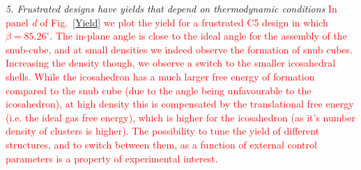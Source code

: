 \documentclass[a4paper, amsfonts, amssymb, amsmath, reprint, showkeys, nofootinbib, twoside]{revtex4-1}
\begin{document}

\noindent
\emph{5. Frustrated designs have yields that depend on thermodynamic conditions} \textcolor{red}{
In panel \textit{d} of Fig.~\ref{Yield} we plot the yield for a frustrated C5 design in which $\beta=85.26^\circ$. The in-plane angle is close to the ideal angle for the assembly of the snub-cube, and at small densities we indeed observe the formation of snub cubes. Increasing the density though, we observe a switch to the smaller icosahedral shells. While the icosahedron has a much larger free energy of formation compared to the snub cube (due to the angle being unfavourable to the icosahedron), at high density this is compensated by the translational free energy (i.e. the ideal gas free energy), which is higher for the icosahedron (as it's number density of clusters is higher). The possibility to tune the yield of different structures, and to switch between them, as a function of external control parameters is a property of experimental interest.}
\end{document}
